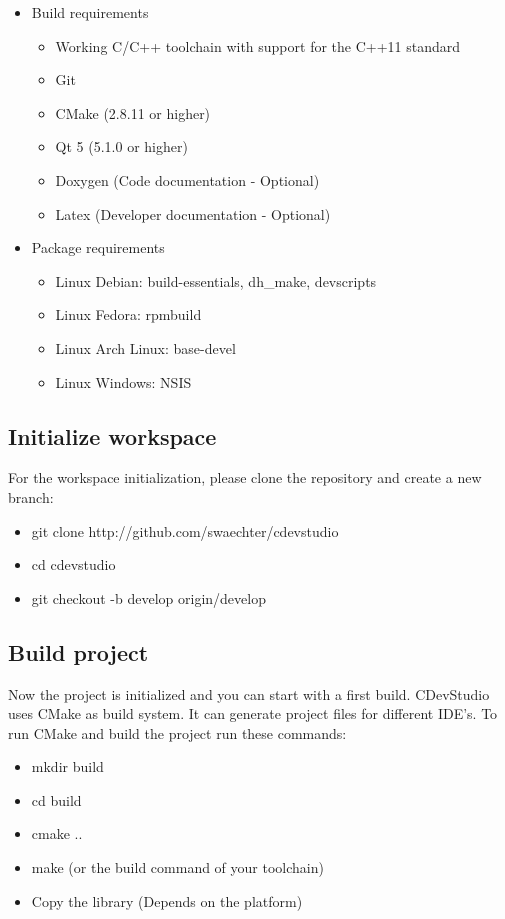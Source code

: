 \documentclass{article}
\begin{document}
\begin{itemize}
	\item Build requirements
	\begin{itemize}
		\item Working C/C++ toolchain with support for the C++11 standard
		\item Git
		\item CMake (2.8.11 or higher)
		\item Qt 5 (5.1.0 or higher)
		\item Doxygen (Code documentation - Optional)
		\item Latex (Developer documentation - Optional)
	\end{itemize}
	\item Package requirements
	\begin{itemize}
		\item Linux Debian: build-essentials, dh_make, devscripts
		\item Linux Fedora: rpmbuild
		\item Linux Arch Linux: base-devel
		\item Linux Windows: NSIS
	\end{itemize}
\end{itemize}

\subsection{Initialize workspace}
For the workspace initialization, please clone the repository and create a new branch:

\begin{itemize}
	\item git clone http://github.com/swaechter/cdevstudio
	\item cd cdevstudio
	\item git checkout -b develop origin/develop
\end{itemize}

\subsection{Build project}
Now the project is initialized and you can start with a first build. CDevStudio uses CMake as build system. It can generate project files for different IDE's. To run CMake and build the project run these commands:

\begin{itemize}
	\item mkdir build
	\item cd build
	\item cmake ..
	\item make (or the build command of your toolchain)
	\item Copy the library (Depends on the platform)
\end{itemize}
\end{document}
